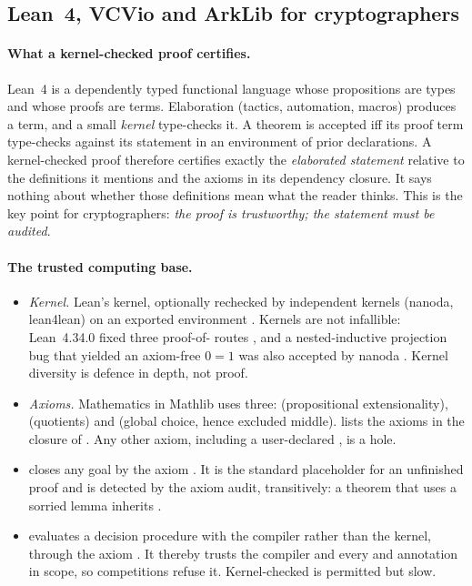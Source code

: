 \subsection{Lean~4, VCVio and ArkLib for cryptographers}\label{subsec:bg-lean}

\paragraph{What a kernel-checked proof certifies.} Lean~4 \cite{MU21-Lean4} is a dependently typed
functional language whose propositions are types and whose proofs are terms. Elaboration (tactics,
automation, macros) produces a term, and a small \emph{kernel} type-checks it. A theorem is
accepted iff its proof term type-checks against its statement in an environment of prior
declarations. A kernel-checked proof therefore certifies exactly the \emph{elaborated statement}
relative to the definitions it mentions and the axioms in its dependency closure. It says nothing
about whether those definitions mean what the reader thinks. This is the key point for
cryptographers: \emph{the proof is trustworthy; the statement must be audited}.

\paragraph{The trusted computing base.}
\begin{itemize}[nosep]
\item \emph{Kernel.} Lean's kernel, optionally rechecked by independent kernels (nanoda, lean4lean)
  on an exported environment \cite{lean4export,nanoda,carneiro2024lean4lean}. Kernels are not
  infallible: Lean~4.34.0 fixed three proof-of- routes \cite{lean4340}, and a
  nested-inductive projection bug that yielded an axiom-free $0=1$ was also accepted by nanoda
  \cite{brossard2026leanproj}. Kernel diversity is defence in depth, not proof.
\item \emph{Axioms.} Mathematics in Mathlib uses three:  (propositional
  extensionality),  (quotients) and  (global choice, hence
  excluded middle).  lists the axioms in the closure of . Any other
  axiom, including a user-declared , is a hole.
\item \emph{} closes any goal by the axiom . It is the standard
  placeholder for an unfinished proof and is detected by the axiom audit, transitively: a theorem
  that uses a sorried lemma inherits .
\item \emph{} evaluates a decision procedure with the compiler rather than the
  kernel, through the axiom . It thereby trusts the compiler and every
   and  annotation in scope, so competitions refuse it.
  Kernel-checked  is permitted but slow.
\end{itemize}

